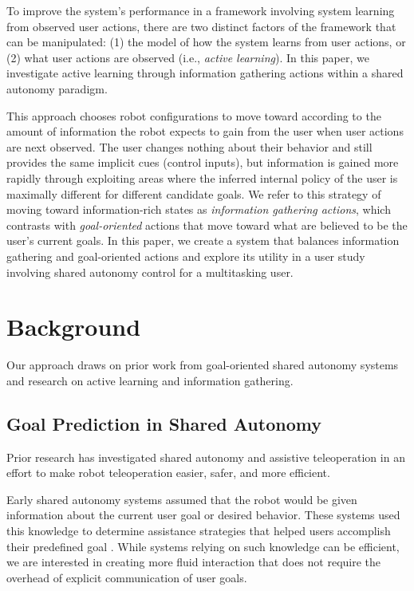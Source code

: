 \documentclass[conference]{IEEEtran}
\begin{document}
To improve the system's performance in a framework involving system learning from observed user actions, there are two distinct factors of the framework that can be manipulated: (1) the model of how the system learns from user actions, or (2) what user actions are observed (i.e., \textit{active learning}). In this paper, we investigate active learning through information gathering actions within a shared autonomy paradigm.

This approach chooses robot configurations to move toward according to the amount of information the robot expects to gain from the user when user actions are next observed. The user changes nothing about their behavior and still provides the same implicit cues (control inputs), but information is gained more rapidly through exploiting areas where the inferred internal policy of the user is maximally different for different candidate goals. We refer to this strategy of moving toward information-rich states as \textit{information gathering actions}, which contrasts with \textit{goal-oriented} actions that move toward what are believed to be the user's current goals. In this paper, we create a system that balances information gathering and goal-oriented actions and explore its utility in a user study involving shared autonomy control for a multitasking user.

\section{Background}

Our approach draws on prior work from goal-oriented shared autonomy systems and research on active learning and information gathering.

\subsection{Goal Prediction in Shared Autonomy}

Prior research has investigated shared autonomy and assistive teleoperation in an effort to make robot teleoperation easier, safer, and more efficient.

Early shared autonomy systems assumed that the robot would be given information about the current user goal or desired behavior. These systems used this knowledge to determine assistance strategies that helped users accomplish their predefined goal \cite{aigner1997human, debus2001cooperative, goodrich2001experiments}. While systems relying on such knowledge can be efficient, we are interested in creating more fluid interaction that does not require the overhead of explicit communication of user goals.
\end{document}
